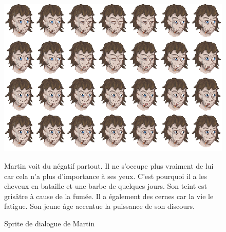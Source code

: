 \documentclass[11pt]{article}
\begin{document}
\begin{appendices}
\begin{figure}[H]
\includegraphics[scale=0.4]{martinFaceAnimation}
\centering
\caption{Sprite de dialogue de Martin}
Martin voit du négatif partout. Il ne s'occupe plus vraiment de lui car cela n'a plus d'importance à ses yeux. C'est pourquoi il a les cheveux en bataille et une barbe de quelques jours. Son teint est grisâtre à cause de la fumée. Il a également des cernes car la vie le fatigue. Son jeune âge accentue la puissance de son discours.
\end{figure}


\end{appendices}
\end{document}
